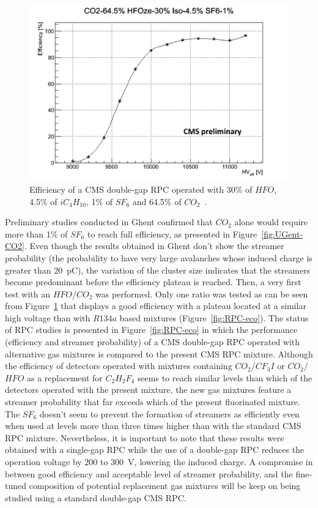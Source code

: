 	\begin{figure}
		\centering
		\includegraphics[width=\linewidth]{fig/chapt3/HFO-UGent.png}
		\caption{\label{fig:UGent-HFO} Efficiency of a CMS double-gap RPC operated with 30\% of $HFO$, 4.5\% of $iC_4H_{10}$, 1\% of $SF_6$ and 64.5\% of $CO_2$~\cite{PICCOLO2016}.}
	\end{figure}
	
	Preliminary studies conducted in Ghent confirmed that $CO_2$ alone would require more than 1\% of $SF_6$ to reach full efficiency, as presented in Figure~\ref{fig:UGent-CO2}. Even though the results obtained in Ghent don't show the streamer probability (the probability to have very large avalanches whose induced charge is greater than \SI{20}{pC}), the variation of the cluster size indicates that the streamers become predominant before the efficiency plateau is reached. Then, a very first test with an $HFO$/$CO_2$ was performed. Only one ratio was tested as can be seen from Figure~\ref{fig:UGent-HFO} that displays a good efficiency with a plateau located at a similar high voltage than with $R134a$ based mixtures (Figure~\ref{fig:RPC-eco}). The status of RPC studies is presented in Figure~\ref{fig:RPC-eco} in which the performance (efficiency and streamer probability) of a CMS double-gap RPC operated with alternative gas mixtures is compared to the present CMS RPC mixture. Although the efficiency of detectors operated with mixtures containing $CO_2$/$CF_3I$ or $CO_2$/$HFO$ as a replacement for $C_2H_2F_4$ seems to reach similar levels than which of the detectors operated with the present mixture, the new gas mixtures feature a streamer probability that far exceeds which of the present fluorinated mixture. The $SF_6$ doesn't seem to prevent the formation of streamers as efficiently even when used at levels more than three times higher than with the standard CMS RPC mixture. Nevertheless, it is important to note that these results were obtained with a single-gap RPC while the use of a double-gap RPC reduces the operation voltage by 200 to \SI{300}{V}, lowering the induced charge. A compromise in between good efficiency and acceptable level of streamer probability, and the fine-tuned composition of potential replacement gas mixtures will be keep on being studied using a standard double-gap CMS RPC.
	

